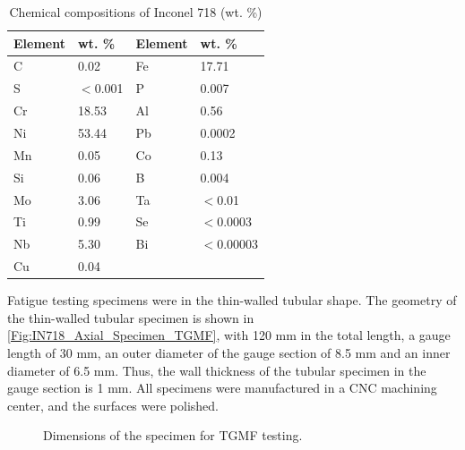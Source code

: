 \documentclass[preprint,5p,twocolumn,10pt,sort&compress]{elsarticle}
\begin{document}
\begin{table}[!ht]
  \centering
  \caption{Chemical compositions of  Inconel 718 (wt. \%)}
    \begin{tabular}{llll}
    \toprule
    Element & wt. \% & Element & wt. \% \\
    \midrule
    C     & 0.02  & Fe    & 17.71 \\
    S     & $<$0.001 & P     & 0.007 \\
    Cr    & 18.53 & Al    & 0.56 \\
    Ni    & 53.44 & Pb    & 0.0002 \\
    Mn    & 0.05  & Co    & 0.13 \\
    Si    & 0.06  & B     & 0.004 \\
    Mo    & 3.06  & Ta    & $<$0.01 \\
    Ti    & 0.99  & Se    & $<$0.0003 \\
    Nb    & 5.30  & Bi    & $<$0.00003 \\
    Cu    & 0.04  &       &  \\
    \bottomrule
    \end{tabular}%
  \label{Tab:ChemicalCompositionofIN718}
\end{table}

Fatigue testing specimens were in the thin-walled tubular shape. The geometry of the thin-walled tubular specimen is shown in \autoref{Fig:IN718_Axial_Specimen_TGMF}, with 120 mm in the total length, a gauge length of 30 mm, an outer diameter of the gauge section of 8.5 mm and an inner diameter of 6.5 mm. Thus, the wall thickness of the tubular specimen in the gauge section is 1 mm. All specimens were manufactured in a CNC machining center, and the surfaces were polished. 

\begin{figure}[!ht]
\caption{Dimensions of the specimen for TGMF testing.}
\label{Fig:IN718_Axial_Specimen_TGMF}
\end{figure}
\end{document}
